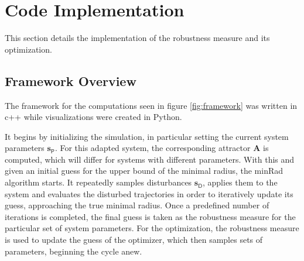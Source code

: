 



    


\section{Code Implementation} \label{codeimplementation}

This section details the implementation of the robustness measure and its optimization. 

\subsection{Framework Overview} \label{framework}

The framework for the computations seen in figure \ref{fig:framework} was written in c++ while visualizations were created in Python.  

It begins by initializing the simulation, in particular setting the current system parameters $\mathbf{s}_{\mathsf{P}}$. For this adapted system, the corresponding attractor $\mathbf{A}$ is computed, which will differ for systems with different parameters. With this and given an initial guess for the upper bound of the minimal radius, the minRad algorithm starts. It repeatedly samples disturbances $\mathbf{s}_{\mathsf{D}}$, applies them to the system and evaluates the disturbed trajectories in order to iteratively update its guess, approaching the true minimal radius. Once a predefined number of iterations is completed, the final guess is taken as the robustness measure for the particular set of system parameters. For the optimization, the robustness measure is used to update the guess of the optimizer, which then samples sets of parameters, beginning the cycle anew. 


